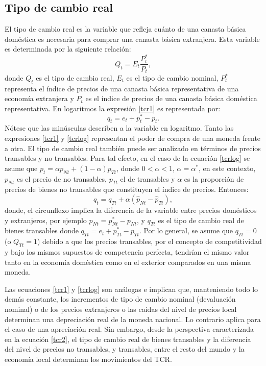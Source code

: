 \documentclass[12pt,letterpaper]{article}
\begin{document}
\subsection*{Tipo de cambio real}
El tipo de cambio real es la variable que refleja cuánto de una canasta básica doméstica es necesaria para comprar una canasta básica extranjera. Esta variable es determinada por la siguiente relación:
\begin{equation}\label{tcr1}
Q_t=E_t\frac{P_t^*}{P_t},
\end{equation}
donde $Q_t$ es el tipo de cambio real, $E_t$ es el tipo de cambio nominal, $P_t^*$ representa el índice de precios de una canasta básica representativa de una economía extranjera y $P_t$ es el índice de precios de una canasta básica doméstica representativa. En logaritmos la expresión \ref{tcr1} es representada por:
\begin{equation}\label{tcrlog}
q_t=e_t+p_t^*-p_t.
\end{equation}
Nótese que las minúsculas describen a la variable en logaritmo. Tanto las expresiones \ref{tcr1} y \ref{tcrlog} representan el poder de compra de una moneda frente a otra. El tipo de cambio real también puede ser analizado en términos de precios transables y no transables. Para tal efecto, en el caso de la ecuación \ref{tcrlog} se asume que $p_t=\alpha p_{Nt} + (1-\alpha)p_{Tt}$, donde $0<\alpha<1$, $\alpha=\alpha^*$, en este contexto, $p_{Nt}$ es el precio de no transables, $p_{Tt}$ el de transables y $\alpha$ es la proporción de precios de bienes no transables que constituyen el índice de precios. Entonces:
\begin{equation}\label{tcr2}
q_t=q_{Tt}+\alpha(\hat{p}_{Nt}-\hat{p}_{Tt}),
\end{equation}
donde, el circunflexo implica la diferencia de la variable entre precios domésticos y extranjeros, por ejemplo $\hat{p}_{Nt}=p_{Nt}^*-p_{Nt}$, y $q_{Tt}$ es el tipo de cambio real de bienes transables donde $q_{Tt}=e_t+p_{Tt}^*-p_{Tt}$. Por lo general, se asume que $q_{Tt}=0$ (o $Q_{Tt}=1$) debido a que los precios transables, por el concepto de competitividad y bajo los mismos supuestos de competencia perfecta, tendrían el mismo valor tanto en la economía doméstica como en el exterior comparados en una misma moneda. 

Las ecuaciones \ref{tcr1} y \ref{tcrlog} son análogas e implican que, manteniendo todo lo demás constante, los incrementos de tipo de cambio nominal (devaluación nominal) o de los precios extranjeros o las caídas del nivel de precios local determinan una depreciación real de la moneda nacional. Lo contrario aplica para el caso de una apreciación real. Sin embargo, desde la perspectiva caracterizada en la ecuación \ref{tcr2}, el tipo de cambio real de bienes transables y la diferencia del nivel de precios no transables, y transables, entre el resto del mundo y la economía local determinan los movimientos del TCR. 
\end{document}
